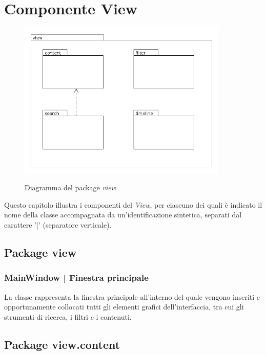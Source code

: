 \documentclass[10pt,a4paper,headinclude,footinclude,hidelinks]{scrreprt} %
\begin{document}
	\chapter{Componente View}
	\label{ch:stage:design:view}

	\begin{figure}[ht]
		\begin{center}
	    	\includegraphics[width=10cm]{package/view.png}
			\label{gfx:package:view}
			\caption{Diagramma del package \textit{view}}
		\end{center}
	\end{figure}

	Questo capitolo illustra i componenti del \textit{View}, per ciascuno dei quali è indicato il nome della classe accompagnata da un'identificazione sintetica, separati dal carattere '|' (separatore verticale).

	\section{Package view}
	\label{sec:stage:design:sistema:view}
	
	\subsection[MainWindow]{MainWindow | Finestra principale}
	\label{sec:stage:design:sistema:view:window}
	La classe \textit{} rappresenta la finestra principale all'interno del quale vengono inseriti e opportunamente collocati tutti gli elementi grafici dell'interfaccia, tra cui gli strumenti di ricerca, i filtri e i contenuti.

	\section{Package view.content}
	\label{sec:stage:design:sistema:view.content}
\end{document}
